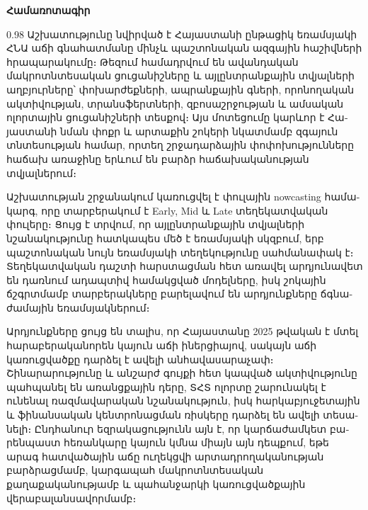 \documentclass[12pt,a4paper]{report}
\begin{document}
        \begin{center}
        {\armenianfrontfont\bfseries Համառոտագիր}
        \end{center}
        \begin{armenian}
        \begin{spacing}{0.98}
        \small
        \sloppy
        Աշխատությունը նվիրված է Հայաստանի ընթացիկ եռամսյակի ՀՆԱ աճի գնահատմանը մինչև պաշտոնական ազգային հաշիվների հրապարակումը։ Թեզում համադրվում են ավանդական մակրոտնտեսական ցուցանիշները և այլընտրանքային տվյալների աղբյուրները՝ փոխարժեքների, ապրանքային գների, որոնողական ակտիվության, տրանսֆերտների, զբոսաշրջության և ամսական ոլորտային ցուցանիշների տեսքով։ Այս մոտեցումը կարևոր է Հայաստանի նման փոքր և արտաքին շոկերի նկատմամբ զգայուն տնտեսության համար, որտեղ շրջադարձային փոփոխությունները հաճախ առաջինը երևում են բարձր հաճախականության տվյալներում։

Աշխատության շրջանակում կառուցվել է փուլային nowcasting համակարգ, որը տարբերակում է Early, Mid և Late տեղեկատվական փուլերը։ Ցույց է տրվում, որ այլընտրանքային տվյալների նշանակությունը հատկապես մեծ է եռամսյակի սկզբում, երբ պաշտոնական նույն եռամսյակի տեղեկությունը սահմանափակ է։ Տեղեկատվական դաշտի հարստացման հետ առավել արդյունավետ են դառնում ադապտիվ համակցված մոդելները, իսկ շոկային ճշգրտմամբ տարբերակները բարելավում են արդյունքները ճգնաժամային եռամսյակներում։

Արդյունքները ցույց են տալիս, որ Հայաստանը 2025 թվական է մտել հարաբերականորեն կայուն աճի իներցիայով, սակայն աճի կառուցվածքը դարձել է ավելի անհավասարաչափ։ Շինարարությունը և անշարժ գույքի հետ կապված ակտիվությունը պահպանել են առանցքային դերը, ՏՀՏ ոլորտը շարունակել է ունենալ ռազմավարական նշանակություն, իսկ հարկաբյուջետային և ֆինանսական կենտրոնացման ռիսկերը դարձել են ավելի տեսանելի։ Ընդհանուր եզրակացությունն այն է, որ կարճաժամկետ բարենպաստ հեռանկարը կայուն կմնա միայն այն դեպքում, եթե արագ հատվածային աճը ուղեկցվի արտադրողականության բարձրացմամբ, կարգապահ մակրոտնտեսական քաղաքականությամբ և պահանջարկի կառուցվածքային վերաբալանսավորմամբ։
        \par
        \end{spacing}
        \end{armenian}
        \clearpage
        \vspace*{0.2cm}
\end{document}
